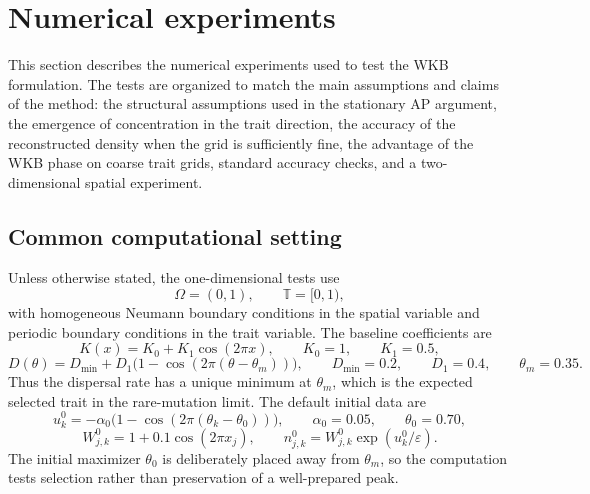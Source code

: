 \documentclass[11pt]{article}
\begin{document}


\section{Numerical experiments}\label{sec:numerics}

This section describes the numerical experiments used to test the WKB formulation.  The tests are organized to match the main assumptions and claims of the method: the structural assumptions used in the stationary AP argument, the emergence of concentration in the trait direction, the accuracy of the reconstructed density when the grid is sufficiently fine, the advantage of the WKB phase on coarse trait grids, standard accuracy checks, and a two-dimensional spatial experiment.

\subsection{Common computational setting}\label{subsec:numerical_common}

Unless otherwise stated, the one-dimensional tests use
\[
    \Omega=(0,1),\qquad \mathbb T=[0,1),
\]
with homogeneous Neumann boundary conditions in the spatial variable and periodic boundary conditions in the trait variable.  The baseline coefficients are
\begin{equation}\label{eq:num_K_baseline_new}
    K(x)=K_0+K_1\cos(2\pi x),
    \qquad K_0=1,
    \qquad K_1=0.5,
\end{equation}
\begin{equation}\label{eq:num_D_baseline_new}
    D(\theta)=D_{\min}+D_1\bigl(1-\cos(2\pi(\theta-\theta_m))\bigr),
    \qquad D_{\min}=0.2,
    \qquad D_1=0.4,
    \qquad \theta_m=0.35.
\end{equation}
Thus the dispersal rate has a unique minimum at \(\theta_m\), which is the expected selected trait in the rare-mutation limit.  The default initial data are
\begin{equation}\label{eq:num_initial_data_new}
    u_k^0=-\alpha_0\bigl(1-\cos(2\pi(\theta_k-\theta_0))\bigr),
    \qquad \alpha_0=0.05,
    \qquad \theta_0=0.70,
\end{equation}
\begin{equation}\label{eq:num_initial_W_new}
    W_{j,k}^0=1+0.1\cos(2\pi x_j),
    \qquad
    n_{j,k}^0=W_{j,k}^0\exp(u_k^0/\varepsilon).
\end{equation}
The initial maximizer \(\theta_0\) is deliberately placed away from \(\theta_m\), so the computation tests selection rather than preservation of a well-prepared peak.
\end{document}
